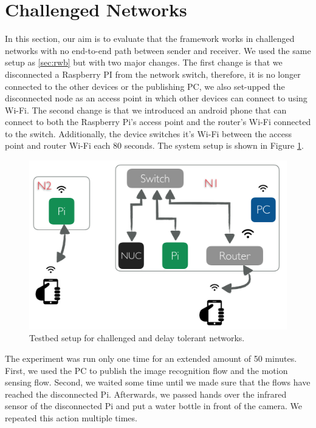 \section{Challenged Networks}
In this section, our aim is to evaluate that the framework works in challenged networks with no end-to-end path between  sender and receiver. We used the same setup as \ref{sec:rwb} but with two major changes. The first change is that we disconnected  a Raspberry PI from the network switch, therefore, it is no longer connected to the other devices or the publishing PC, we also set-upped the disconnected node as an access point in which other devices can connect to using Wi-Fi. The second change is that we introduced an android phone that can connect to both the Raspberry Pi's access point and the router's Wi-Fi connected to the switch. Additionally, the device switches it's Wi-Fi between the access point and router Wi-Fi each 80 seconds. The system setup is shown in Figure \ref{fig:tb-dtn}.
\begin{figure}[H]
	\centering
	\includegraphics[scale=0.6]{images/tb-dtn.png}
	\caption{Testbed setup for challenged and delay tolerant networks.}
	\label{fig:tb-dtn}
\end{figure} 

\noindent The experiment was run only one time for an extended amount of 50 minutes. First, we used the PC to publish the image recognition flow and the motion sensing flow. Second, we waited some time until we made sure that the flows have reached the disconnected Pi. Afterwards, we passed hands over the infrared sensor of the disconnected Pi and put a water bottle in front of the camera. We repeated this action multiple times.\\

